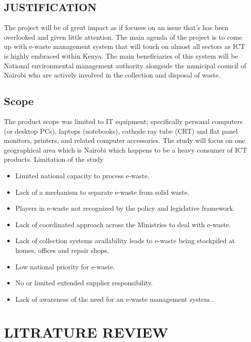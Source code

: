 \documentclass{article}
\begin{document}
\subsection{ JUSTIFICATION}
The project will be of great impact as if focuses on an issue that’s has been overlooked and given little attention. The main agenda of the project is to come up with e-waste management system that will touch on almost all sectors as ICT is highly embraced within Kenya. The main beneficiaries of this system will be National environmental management authority alongside the municipal council of Nairobi who are actively involved in the collection and disposal of waste.
\subsection{ Scope}
The product scope was limited to IT equipment; specifically personal computers (or desktop PCs), laptops (notebooks), cathode ray tube (CRT) and flat panel monitors, printers, and related computer accessories. 
The study will focus on one geographical area which is Nairobi which happens to be a heavy consumer of ICT products.
Limitation of the study
\begin{itemize}
\item Limited national capacity to process e-waste.
\item	Lack of a mechanism to separate e-waste from solid waste.
\item	Players in e-waste not recognized by the policy and legislative framework.
\item	Lack of coordinated approach across the Ministries to deal with e-waste.
\item	Lack of collection systems availability leads to e-waste being stockpiled at homes, offices and repair shops.
\item	Low national priority for e-waste.
\item	No or limited extended supplier responsibility.
\item	Lack of awareness of the need for an e-waste management system .
\end{itemize}
\newpage
\section{LITRATURE REVIEW }
\end{document}
